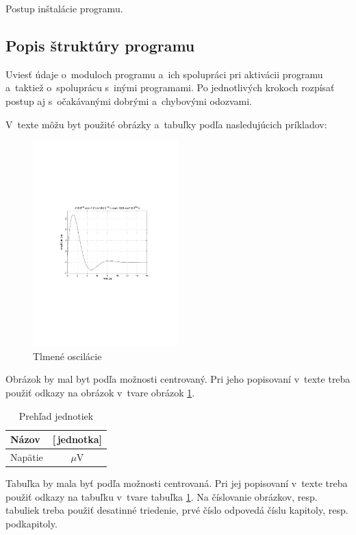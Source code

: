 \documentclass[a4paper]{feidippp}
\begin{document}
Postup inštalácie programu.

\subsection{Popis štruktúry programu}

Uviesť údaje o~moduloch  programu a~ich spolupráci pri aktivácii programu a~taktiež             o~spoluprácu s~inými programami. Po jednotlivých krokoch rozpísať postup aj s~očakávanými  dobrými a~chybovými odozvami.

V~texte môžu byt použité obrázky a~tabuľky  podľa nasledujúcich príkladov:

\begin{figure}[!ht]
\centering 
\includegraphics[width=0.5\textwidth]{tlmosc}
\caption{Tlmené oscilácie}\label{o:1}
\end{figure}

Obrázok by mal byt podľa možnosti centrovaný. Pri jeho popisovaní v~texte treba použiť odkazy na obrázok v~tvare obrázok \ref{o:1}.

\begin{table}[!ht]\caption{Prehľad jednotiek}\label{t:1}
\smallskip
\centering
\begin{tabular}{|l|c|} \hline
Názov	& [\,jednotka] \\ \hline
Napätie & $\mu$V \\ \hline
\end{tabular}	
\end{table}


Tabuľka by mala byť podľa možnosti centrovaná. Pri jej popisovaní v~texte treba použiť odkazy na tabuľku v~tvare tabuľka \ref{t:1}.
Na číslovanie obrázkov, resp. tabuliek treba použiť desatinné triedenie, prvé číslo odpovedá číslu kapitoly, resp. podkapitoly.
\end{document}
